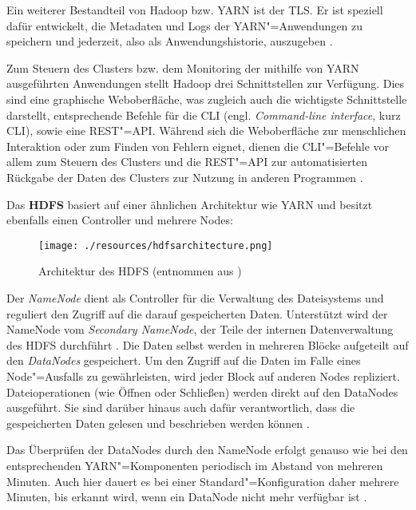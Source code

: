 Ein weiterer Bestandteil von Hadoop bzw. \ac{YARN} ist der \ac{TLS}.
Er ist speziell dafür entwickelt, die Metadaten und Logs der \ac{YARN}"=Anwendungen zu speichern und jederzeit, also als Anwendungshistorie, auszugeben \cite{HadoopYarnTlServer271}.

Zum Steuern des Clusters bzw. dem Monitoring der mithilfe von \ac{YARN} ausgeführten Anwendungen stellt Hadoop drei Schnittstellen zur Verfügung.
Dies sind eine graphische Weboberfläche, was zugleich auch die wichtigste Schnittstelle darstellt, entsprechende Befehle für die \acl{CLI} (engl. \emph{Command-line interface}, kurz \acs{CLI}), sowie eine REST"=API.
Während sich die Weboberfläche zur menschlichen Interaktion oder zum Finden von Fehlern eignet, dienen die \ac{CLI}"=Befehle vor allem zum Steuern des Clusters und die REST"=API zur automatisierten Rückgabe der Daten des Clusters zur Nutzung in anderen Programmen \cite{HadoopClusterSetup271,HadoopYarnCmds271,HadoopRmApi271,HadoopNmApi271}.

Das \textbf{\ac{HDFS}} basiert auf einer ähnlichen Architektur wie \ac{YARN} und besitzt ebenfalls einen Controller und mehrere Nodes:

\begin{figure}[h]
    \texttt{[image: ./resources/hdfsarchitecture.png]}
    \caption[Architektur des HDFS]
    {Architektur des \acs{HDFS} (entnommen aus \cite{HadoopHdfsDesc271})}
    \label{fig:hdfsarch}
\end{figure}

Der \emph{NameNode} dient als Controller für die Verwaltung des Dateisystems und reguliert den Zugriff auf die darauf gespeicherten Daten.
Unterstützt wird der NameNode vom \emph{Secondary NameNode}, der Teile der internen Datenverwaltung des \ac{HDFS} durchführt \cite{HadoopHdfsGuide271}.
Die Daten selbst werden in mehreren Blöcke aufgeteilt auf den \emph{DataNodes} gespeichert.
Um den Zugriff auf die Daten im Falle eines Node"=Ausfalls zu gewährleisten, wird jeder Block auf anderen Nodes repliziert.
Dateioperationen (wie Öffnen oder Schließen) werden direkt auf den DataNodes ausgeführt.
Sie sind darüber hinaus auch dafür verantwortlich, dass die gespeicherten Daten gelesen und beschrieben werden können \cite{HadoopHdfsDesc271}.

Das Überprüfen der DataNodes durch den NameNode erfolgt genauso wie bei den entsprechenden \ac{YARN}"=Komponenten periodisch im Abstand von mehreren Minuten.
Auch hier dauert es bei einer Standard"=Konfiguration daher mehrere Minuten, bis erkannt wird, wenn ein DataNode nicht mehr verfügbar ist \cite{HadoopHdfsConfig271}.
